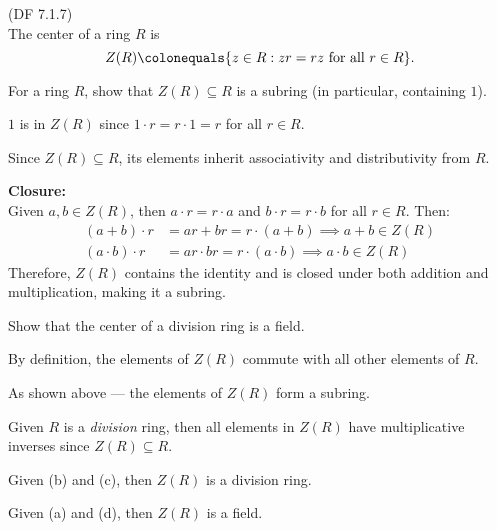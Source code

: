 \begin{problem}{(\textsf{DF 7.1.7})} \\
  The \textsf{center} of a ring $R$ is 
  \[ Z(R) \colonequals \{z \in R : zr=rz \text{ for all $r \in R$}\}. \]
  \begin{enumalph}
    \item For a ring $R$, show that $Z(R) \subseteq R$ is a subring
      (in particular, containing $1$).
      \begin{Answer}
        \begin{enumalph}
          \item $1$ is in $Z(R)$ since $1\cdot r=r \cdot 1 = r$ for all $r \in R$.
          \item Since $Z(R) \subseteq R$, its elements inherit associativity and distributivity from $R$.
          \item \textbf{Closure:} \\
            Given $a, b \in Z(R)$, then $a \cdot r = r \cdot a$
            and $b \cdot r = r \cdot b$ for all $r \in R$.
            Then:
            \begin{align*}
              (a + b) \cdot r &= ar + br = r \cdot (a + b) \implies a + b \in Z(R) \\
              (a \cdot b) \cdot r &= ar \cdot br = r \cdot (a \cdot b) \implies a \cdot b \in Z(R)
            \end{align*}
            Therefore, $Z(R)$ contains the identity and is closed
            under both addition and multiplication, making it a subring.
        \end{enumalph}
      \end{Answer}
    \item Show that the center of a division ring is a field.
    \begin{Answer}
      \begin{enumalph}
        \item By definition, the elements of $Z(R)$ commute with all other elements of $R$.
        \item As shown above --- the elements of $Z(R)$ form a subring.
        \item Given $R$ is a \emph{division} ring, then
          all elements in $Z(R)$ have multiplicative inverses
          since $Z(R) \subseteq R$.
        \item Given (b) and (c), then $Z(R)$ is a division ring.
        \item Given (a) and (d), then $Z(R)$ is a field.
      \end{enumalph}
    \end{Answer}
  \end{enumalph}
\end{problem}
